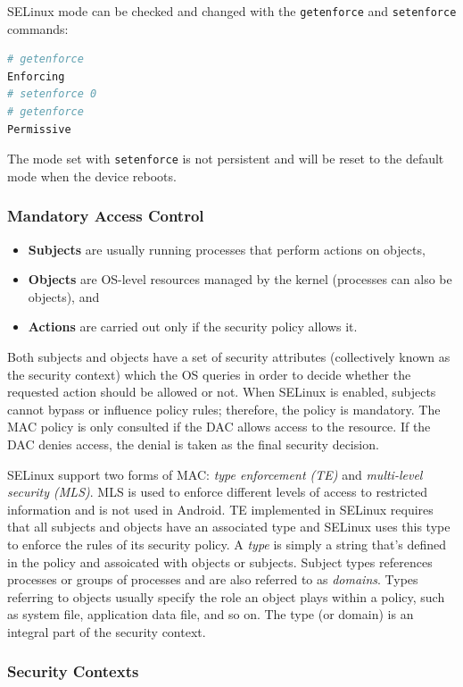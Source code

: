 SELinux mode can be checked and changed with the \texttt{getenforce} and \texttt{setenforce} commands:
\begin{lstlisting}[language=sh]
# getenforce
Enforcing
# setenforce 0
# getenforce
Permissive
\end{lstlisting}
The mode set with \texttt{setenforce} is not persistent and will be reset to the default mode when the device reboots.

\subsubsection{Mandatory Access Control}

\begin{itemize}
\item \textbf{Subjects} are usually running processes that perform actions on objects,
\item \textbf{Objects} are OS-level resources managed by the kernel (processes can also be objects), and
\item \textbf{Actions} are carried out only if the security policy allows it.
\end{itemize}
Both subjects and objects have a set of security attributes (collectively known as the security context) which the OS queries in order to decide whether the requested action should be allowed or not. When SELinux is enabled, subjects cannot bypass or influence policy rules; therefore, the policy is mandatory. The MAC policy is only consulted if the DAC allows access to the resource. If the DAC denies access, the denial is taken as the final security decision. 

SELinux support two forms of MAC: \textit{type enforcement (TE)} and \textit{multi-level security (MLS)}. 
MLS is used to enforce different levels of access to restricted information and is not used in Android. 
TE implemented in SELinux requires that all subjects and objects have an associated type and SELinux uses this type to enforce the rules of its security policy. A \textit{type} is simply a string that's defined in the policy and assoicated with objects or subjects. Subject types references processes or groups of processes and are also referred to as \textit{domains}. Types referring to objects usually specify the role an object plays within a policy, such as system file, application data file, and so on. The type (or domain) is an integral part of the security context.

\subsubsection{Security Contexts}

